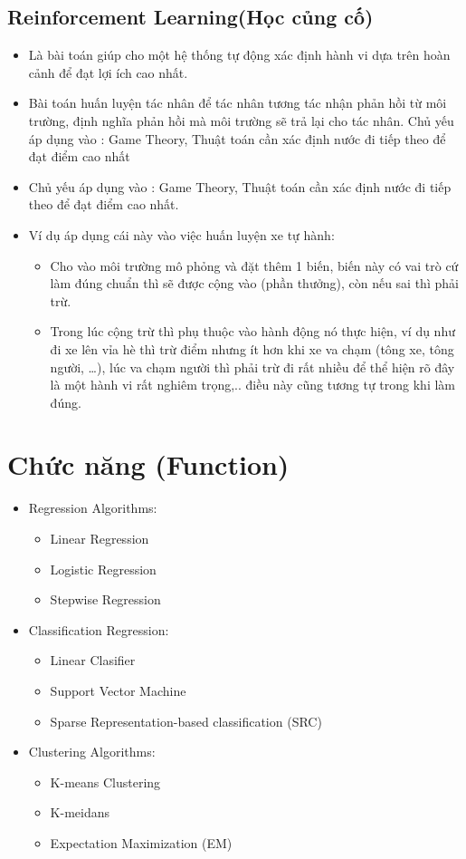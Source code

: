    \subsection{Reinforcement Learning(Học củng cố)}
    \begin{itemize}
        \item Là bài toán giúp cho một hệ thống tự động xác định hành vi dựa trên hoàn cảnh để đạt lợi ích cao nhất.
        \item Bài toán huấn luyện tác nhân để tác nhân tương tác nhận phản hồi từ môi trường, định nghĩa phản hồi mà môi trường sẽ trả lại cho tác nhân.
Chủ yếu áp dụng vào : Game Theory, Thuật toán cần xác định nước đi tiếp theo để đạt điểm cao nhất
        \item Chủ yếu áp dụng vào : Game Theory, Thuật toán cần xác định nước đi tiếp theo để đạt điểm cao nhất.
        \item Ví dụ áp dụng cái này vào việc huấn luyện xe tự hành: 
        \begin{itemize}
            \item Cho vào môi trường mô phỏng và đặt thêm 1 biến, biến này có vai trò cứ làm đúng chuẩn thì sẽ được cộng vào (phần thưởng), còn nếu sai thì phải trừ.
            \item Trong lúc cộng trừ thì phụ thuộc vào hành động nó thực hiện, ví dụ như đi xe lên vỉa hè thì trừ điểm nhưng ít hơn khi xe va chạm (tông xe, tông người, …), lúc va chạm người thì phải trừ đi rất nhiều để thể hiện rõ đây là một hành vi rất nghiêm trọng,.. điều này cũng tương tự trong khi làm đúng.
        \end{itemize}
    \end{itemize}
\section{Chức năng (Function)}
\begin{itemize}
    \item Regression Algorithms:
    \begin{itemize}
        \item Linear Regression
        \item Logistic Regression
        \item Stepwise Regression
    \end{itemize}
    \item Classification Regression:
    \begin{itemize}
        \item Linear Clasifier
        \item Support Vector Machine
        \item Sparse Representation-based classification (SRC)
    \end{itemize}
    \item Clustering Algorithms:
    \begin{itemize}
        \item K-means Clustering
        \item K-meidans
        \item Expectation Maximization (EM)
    \end{itemize}
\end{itemize}


